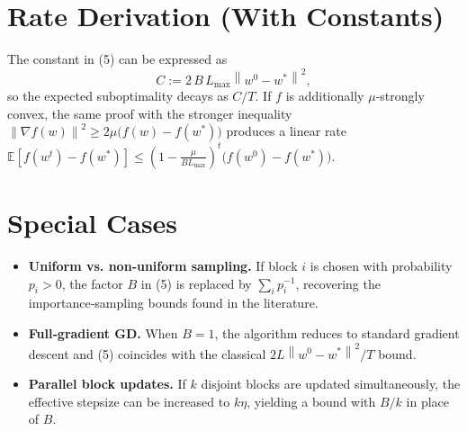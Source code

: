 \documentclass[11pt]{article}
\newcommand{\E}{\mathbb{E}}
\newcommand{\norm}[1]{\left\|#1\right\|}
\begin{document}
\section*{Rate Derivation (With Constants)}
The constant in (5) can be expressed as
\[
C:=2\,B\,L_{\max}\norm{w^{0}-w^{*}}^{2},
\]
so the expected suboptimality decays as $C/T$.
If $f$ is additionally $\mu$‑strongly convex,
the same proof with the stronger inequality
$\norm{\nabla f(w)}^{2}\ge 2\mu\bigl(f(w)-f(w^{*})\bigr)$
produces a linear rate
$\E[f(w^{t})-f(w^{*})]\le (1-\frac{\mu}{B L_{\max}})^{t}
\bigl(f(w^{0})-f(w^{*})\bigr)$.

\section*{Special Cases}
\begin{itemize}[leftmargin=*]
\item \textbf{Uniform vs. non‑uniform sampling.}
If block $i$ is chosen with probability $p_{i}>0$, the factor $B$ in (5)
is replaced by $\sum_{i}p_{i}^{-1}$, recovering the importance‑sampling
bounds found in the literature.
\item \textbf{Full‑gradient GD.}
When $B=1$, the algorithm reduces to standard gradient descent and (5)
coincides with the classical $2L\norm{w^{0}-w^{*}}^{2}/T$ bound.
\item \textbf{Parallel block updates.}
If $k$ disjoint blocks are updated simultaneously, the effective
stepsize can be increased to $k\eta$, yielding a bound with $B/k$ in place
of $B$.
\end{itemize}
\end{document}
